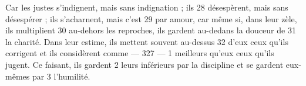 Car les justes s'indignent, mais sans indignation ; ils	 
28	 	désespèrent, mais sans désespérer ; ils s'acharnent, mais c'est	 
29	 	par amour, car même si, dans leur zèle, ils multiplient	 
30	 	au-dehors les reproches, ils gardent au-dedans la douceur de	 
31	 	la charité. Dans leur estime, ils mettent souvent au-dessus	 
32	 	d'eux ceux qu'ils corrigent et ils considèrent comme	 
 	--- 327 ---	 
1	 	meilleurs qu'eux ceux qu'ils jugent. Ce faisant, ils gardent	 
2	 	leurs inférieurs par la discipline et se gardent eux-mêmes par	 
3	 	l'humilité.